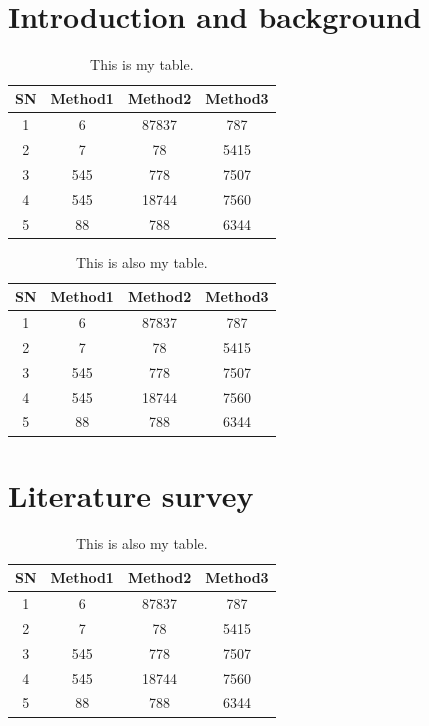\begin{center}
{\huge\textbf{\ttitle}}\\
\end{center}
\section{Introduction and background}
\begin{table}[h!]
\centering
 \begin{tabular}{c c c c} 
 \hline
 SN & Method1 & Method2 & Method3 \\ [0.5ex] 
 \hline
 1 & 6 & 87837 & 787 \\ 
 2 & 7 & 78 & 5415 \\
 3 & 545 & 778 & 7507 \\
 4 & 545 & 18744 & 7560 \\
 5 & 88 & 788 & 6344 \\ [1ex] 
 \hline
 \end{tabular}
 \caption{\label{tab:mytab1} This is my table.}
\end{table}


\begin{table}[h!]
\centering
 \begin{tabular}{c c c c} 
 \hline
 SN & Method1 & Method2 & Method3 \\ [0.5ex] 
 \hline
 1 & 6 & 87837 & 787 \\ 
 2 & 7 & 78 & 5415 \\
 3 & 545 & 778 & 7507 \\
 4 & 545 & 18744 & 7560 \\
 5 & 88 & 788 & 6344 \\ [1ex] 
 \hline
 \end{tabular}
 \caption{\label{tab:mytab2} This is also my table.}
\end{table}


\clearpage
\section{Literature survey}
\begin{table}[h!]
\centering
 \begin{tabular}{c c c c} 
 \hline
 SN & Method1 & Method2 & Method3 \\ [0.5ex] 
 \hline
 1 & 6 & 87837 & 787 \\ 
 2 & 7 & 78 & 5415 \\
 3 & 545 & 778 & 7507 \\
 4 & 545 & 18744 & 7560 \\
 5 & 88 & 788 & 6344 \\ [1ex] 
 \hline
 \end{tabular}
 \caption{\label{tab:mytab3} This is also my table.}
\end{table}\clearpage






